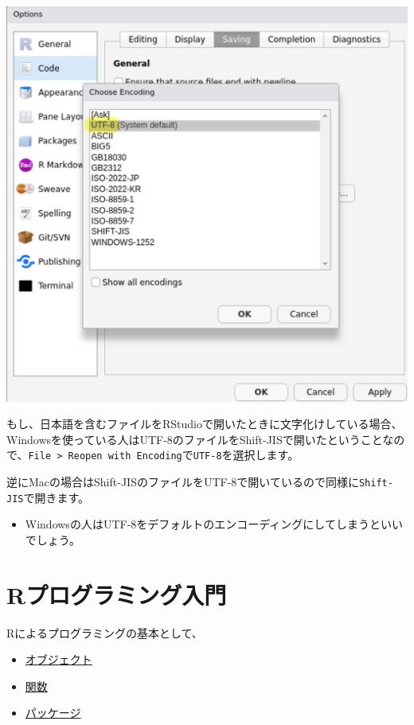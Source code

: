 \documentclass[]{bxjsreport}
\providecommand{\tightlist}{%
  \setlength{\itemsep}{0pt}\setlength{\parskip}{0pt}}
\renewcommand{\section}{\chapter}
\begin{document}
\includegraphics{figures/Rstudio7.jpg}

もし、日本語を含むファイルをRStudioで開いたときに文字化けしている場合、Windowsを使っている人はUTF-8のファイルをShift-JISで開いたということなので、\texttt{File\ \textgreater{}\ Reopen\ with\ Encoding}で\texttt{UTF-8}を選択します。

逆にMacの場合はShift-JISのファイルをUTF-8で開いているので同様に\texttt{Shift-JIS}で開きます。

\begin{itemize}
\tightlist
\item
  Windowsの人はUTF-8をデフォルトのエンコーディングにしてしまうといいでしょう。
\end{itemize}

\hypertarget{intro-r}{%
\section{Rプログラミング入門}\label{intro-r}}

Rによるプログラミングの基本として、

\begin{itemize}
\tightlist
\item
  \protect\hyperlink{ux30aaux30d6ux30b8ux30a7ux30afux30c8}{オブジェクト}
\item
  \protect\hyperlink{ux95a2ux6570}{関数}
\item
  \protect\hyperlink{ux30d1ux30c3ux30b1ux30fcux30b8}{パッケージ}
\end{itemize}
\end{document}

